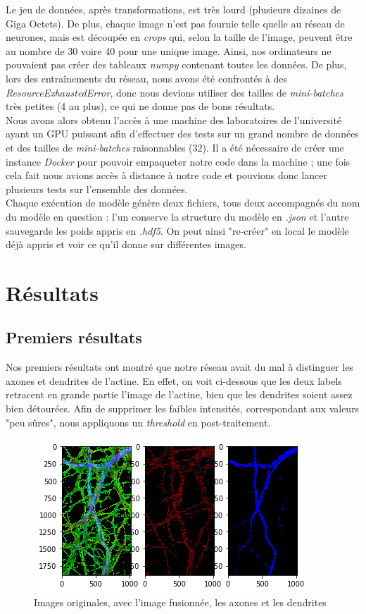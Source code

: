 \documentclass{report}
\begin{document}
Le jeu de données, après transformations, est très lourd (plusieurs dizaines de Giga Octets).
De plus, chaque image n'est pas fournie telle quelle au réseau de neurones, mais
est découpée en \textit{crops} qui, selon la taille de l'image, peuvent être au nombre
de 30 voire 40 pour une unique image. Ainsi, nos ordinateurs ne pouvaient pas
créer des tableaux \textit{numpy} contenant toutes les données. De plus, lors des
entraînements du réseau, nous avons été confrontés à des \textit{ResourceExhaustedError},
donc nous devions utiliser des tailles de \textit{mini-batches} très petites (4 au plus),
ce qui ne donne pas de bons résultats. \\
Nous avons alors obtenu l'accès à une machine des laboratoires de l'université ayant
un GPU puissant afin d'effectuer des tests sur un grand nombre de données et des
tailles de \textit{mini-batches} raisonnables (32). Il a été nécessaire de créer
une instance \textit{Docker} pour pouvoir empaqueter notre code dans la machine ;
une fois cela fait nous avions accès à distance à notre code et pouvions donc
lancer plusieurs tests sur l'ensemble des données. \\
Chaque exécution de modèle génère deux fichiers, tous deux accompagnés du nom du
modèle en question : l'un conserve la structure du modèle en \textit{.json} et
l'autre sauvegarde les poids appris en \textit{.hdf5}. On peut ainsi "re-créer"
en local le modèle déjà appris et voir ce qu'il donne sur différentes images.


\chapter{Résultats}

\section{Premiers résultats}

Nos premiers résultats ont montré que notre réseau avait du mal à distinguer
les axones et dendrites de l'actine. En effet, on voit ci-dessous que les deux labels
retracent en grande partie l'image de l'actine, bien que les dendrites soient assez
bien détourées. Afin de supprimer les faibles intensités, correspondant aux valeurs
"peu sûres", nous appliquons un \textit{threshold} en post-traitement.

\begin{figure}[H]
\centering
\includegraphics[scale=0.5]{"truth"}
\caption{Images originales, avec l'image fusionnée, les axones et les dendrites}
\end{figure}
\end{document}
